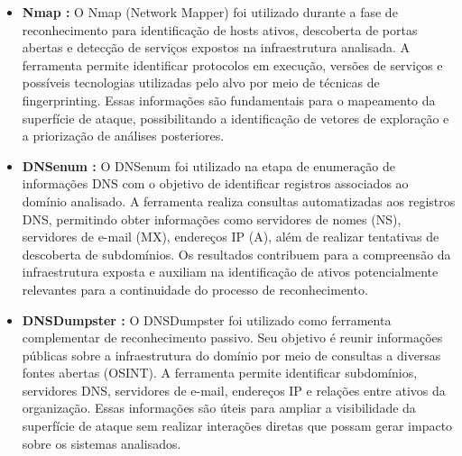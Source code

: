 \documentclass[12pt]{article}
\begin{document}
\begin{itemize}


\item \textbf{Nmap \cite{nmap2}:} O Nmap (Network Mapper) foi utilizado durante a fase de reconhecimento para identificação de hosts ativos, descoberta de portas 
abertas e detecção de serviços expostos na infraestrutura analisada. A ferramenta permite identificar protocolos em execução, versões de serviços e possíveis 
tecnologias utilizadas pelo alvo por meio de técnicas de fingerprinting. Essas informações são fundamentais para o mapeamento da superfície de ataque, possibilitando 
a identificação de vetores de exploração e a priorização de análises posteriores.


\item \textbf{DNSenum \cite{dnsenum}:} O DNSenum foi utilizado na etapa de enumeração de informações DNS com o objetivo de identificar registros associados ao domínio analisado. 
A ferramenta realiza consultas automatizadas aos registros DNS, permitindo obter informações como servidores de nomes (NS), servidores de e-mail (MX), endereços IP (A), além de 
realizar tentativas de descoberta de subdomínios. Os resultados contribuem para a compreensão da infraestrutura exposta e auxiliam na identificação de ativos potencialmente relevantes 
para a continuidade do processo de reconhecimento.

\item \textbf{DNSDumpster \cite{dnsdumpster}:} O DNSDumpster foi utilizado como ferramenta complementar de reconhecimento passivo. Seu objetivo é reunir informações públicas sobre a 
infraestrutura do domínio por meio de consultas a diversas fontes abertas (OSINT). A ferramenta permite identificar subdomínios, servidores DNS, servidores de e-mail, endereços IP e 
relações entre ativos da organização. Essas informações são úteis para ampliar a visibilidade da superfície de ataque sem realizar interações diretas que possam gerar impacto sobre 
os sistemas analisados.


\end{itemize}
\end{document}
